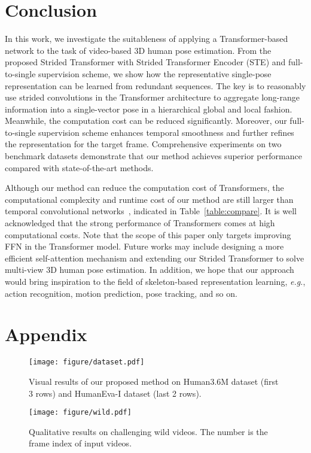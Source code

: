 \documentclass[journal]{IEEEtran}
\begin{document}
\section{Conclusion} 
In this work, we investigate the suitableness of applying a Transformer-based network to the task of video-based 3D human pose estimation. 
From the proposed Strided Transformer with Strided Transformer Encoder (STE) and full-to-single supervision scheme, we show how the representative single-pose representation can be learned from redundant sequences. 
The key is to reasonably use strided convolutions in the Transformer architecture to aggregate long-range information into a single-vector pose in a hierarchical global and local fashion. 
Meanwhile, the computation cost can be reduced significantly. 
Moreover, our full-to-single supervision scheme enhances temporal smoothness and further refines the representation for the target frame. 
Comprehensive experiments on two benchmark datasets demonstrate that our method achieves superior performance compared with state-of-the-art methods. 

Although our method can reduce the computation cost of Transformers, the computational complexity and runtime cost of our method are still larger than temporal convolutional networks~\cite{pavllo20193d,chen2021anatomy}, indicated in Table~\ref{table:compare}. 
It is well acknowledged that the strong performance of Transformers comes at high computational costs. 
Note that the scope of this paper only targets improving FFN in the Transformer model. 
Future works may include designing a more efficient self-attention mechanism and extending our Strided Transformer to solve multi-view 3D human pose estimation. 
In addition, we hope that our approach would bring inspiration to the field of skeleton-based representation learning, \emph{e.g.}, action recognition, motion prediction, pose tracking, and so on. 




\newpage
\section{Appendix} 

\begin{figure*}[!hb]
	\centering
	\texttt{[image: figure/dataset.pdf]}
	\caption
	{
    Visual results of our proposed method on Human3.6M dataset (first 3 rows) and HumanEva-I dataset (last 2 rows). 
	}
	\label{fig:dataset}
\end{figure*}

\begin{figure*}[!hb]
	\centering
	\texttt{[image: figure/wild.pdf]}
	\caption
	{
    Qualitative results on challenging wild videos. 
    The number is the frame index of input videos.
	}
	\label{fig:wild}
\end{figure*}
\end{document}
